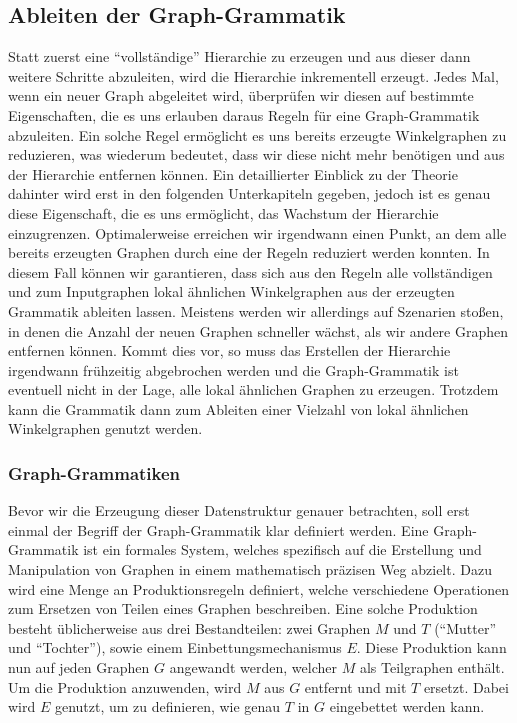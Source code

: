 \subsection{Ableiten der Graph-Grammatik}
Statt zuerst eine ``vollständige'' Hierarchie zu erzeugen und aus
dieser dann weitere Schritte abzuleiten, wird die Hierarchie inkrementell erzeugt. Jedes Mal, wenn ein neuer Graph abgeleitet wird, überprüfen
wir diesen auf bestimmte Eigenschaften, die es uns erlauben daraus Regeln für eine Graph-Grammatik abzuleiten. Ein solche Regel ermöglicht es
uns bereits erzeugte Winkelgraphen zu reduzieren, was wiederum bedeutet, dass wir diese nicht mehr benötigen und aus der Hierarchie entfernen
können. Ein detaillierter Einblick zu der Theorie dahinter wird erst in den folgenden Unterkapiteln gegeben, jedoch ist es genau diese Eigenschaft,
die es uns ermöglicht, das Wachstum der Hierarchie einzugrenzen. Optimalerweise erreichen wir irgendwann einen Punkt, an dem alle bereits erzeugten
Graphen durch eine der Regeln reduziert werden konnten. In diesem Fall können wir garantieren, dass sich aus den Regeln alle vollständigen
und zum Inputgraphen lokal ähnlichen Winkelgraphen aus der erzeugten Grammatik ableiten lassen. Meistens werden wir allerdings auf
Szenarien stoßen, in denen die Anzahl der neuen Graphen schneller wächst, als wir andere Graphen entfernen können. Kommt dies vor, so muss das
Erstellen der Hierarchie irgendwann frühzeitig abgebrochen werden und die Graph-Grammatik ist eventuell nicht in der Lage, alle lokal ähnlichen
Graphen zu erzeugen. Trotzdem kann die Grammatik dann zum Ableiten einer Vielzahl von lokal ähnlichen Winkelgraphen genutzt werden.

\subsubsection{Graph-Grammatiken}
Bevor wir die Erzeugung dieser Datenstruktur genauer betrachten, soll erst einmal der Begriff der Graph-Grammatik klar definiert werden.
Eine Graph-Grammatik ist ein formales System, welches spezifisch auf die Erstellung und Manipulation von Graphen in einem mathematisch
präzisen Weg abzielt. Dazu wird eine Menge an Produktionsregeln definiert, welche verschiedene Operationen zum Ersetzen von Teilen
eines Graphen beschreiben. Eine solche Produktion besteht üblicherweise aus drei Bestandteilen: zwei Graphen \(M\) und \(T\) (``Mutter'' und
``Tochter''), sowie einem Einbettungsmechanismus \(E\). Diese Produktion kann nun auf jeden Graphen \(G\) angewandt werden, welcher \(M\)
als Teilgraphen enthält. Um die Produktion anzuwenden, wird \(M\) aus \(G\) entfernt und mit \(T\) ersetzt. Dabei wird \(E\) genutzt, um zu
definieren, wie genau \(T\) in \(G\) eingebettet werden kann. \cite{31_engelfriet_rozenberg}

